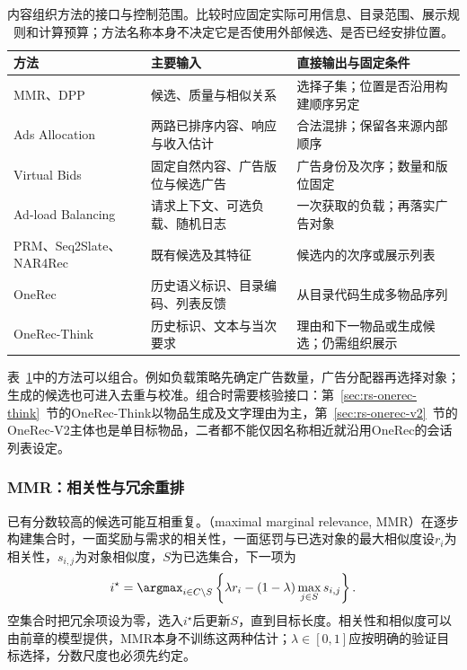 \begin{table}[htbp]
 \centering\small
 \begin{tabularx}{\linewidth}{@{}p{28mm}XX@{}}
  \toprule
  方法 & 主要输入 & 直接输出与固定条件\\
  \midrule
  MMR、DPP & 候选、质量与相似关系 & 选择子集；位置是否沿用构建顺序另定\\
  Ads Allocation & 两路已排序内容、响应与收入估计 & 合法混排；保留各来源内部顺序\\
  Virtual Bids & 固定自然内容、广告版位与候选广告 & 广告身份及次序；数量和版位固定\\
  Ad-load Balancing & 请求上下文、可选负载、随机日志 & 一次获取的负载；再落实广告对象\\
  PRM、Seq2Slate、NAR4Rec & 既有候选及其特征 & 候选内的次序或展示列表\\
  OneRec & 历史语义标识、目录编码、列表反馈 & 从目录代码生成多物品序列\\
  OneRec-Think & 历史标识、文本与当次要求 & 理由和下一物品或生成候选；仍需组织展示\\
  \bottomrule
 \end{tabularx}
 \caption{内容组织方法的接口与控制范围。比较时应固定实际可用信息、目录范围、展示规则和计算预算；方法名称本身不决定它是否使用外部候选、是否已经安排位置。}
 \label{tab:rs-content-interfaces}
\end{table}

表~\ref{tab:rs-content-interfaces}中的方法可以组合。例如负载策略先确定广告数量，广告分配器再选择对象；生成的候选也可进入去重与校准。组合时需要核验接口：第~\ref{sec:rs-onerec-think}~节的OneRec-Think以物品生成及文字理由为主，第~\ref{sec:rs-onerec-v2}~节的OneRec-V2主体也是单目标物品，二者都不能仅因名称相近就沿用OneRec的会话列表设定。

\subsubsection{MMR：相关性与冗余重排}
\label{sec:rs-mmr}

已有分数较高的候选可能互相重复。（maximal marginal relevance, MMR）在逐步构建集合时，一面奖励与需求的相关性，一面惩罚与已选对象的最大相似度设$r_i$为相关性，$s_{i,j}$为对象相似度，$S$为已选集合，下一项为
\begin{equation}
 i^\star=\argmax_{i\in C\setminus S}
 \left\{\lambda r_i-(1-\lambda)\max_{j\in S}s_{i,j}\right\}.
 \label{eq:rs-mmr}
\end{equation}
空集合时把冗余项设为零，选入$i^\star$后更新$S$，直到目标长度。相关性和相似度可以由前章的模型提供，MMR本身不训练这两种估计；$\lambda\in[0,1]$应按明确的验证目标选择，分数尺度也必须先约定。

